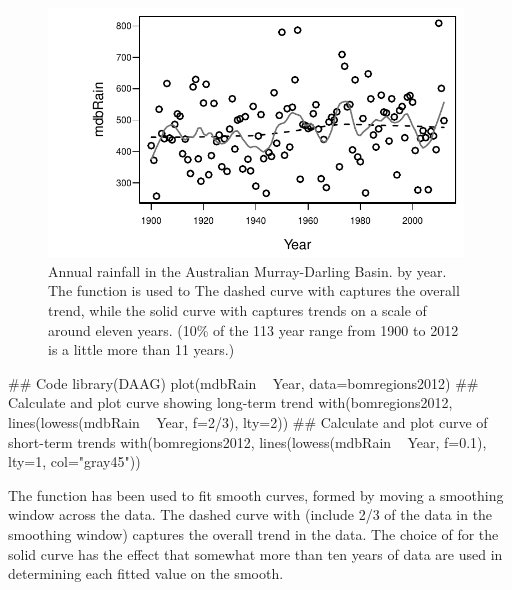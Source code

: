 \begin{figure}
\begin{Schunk}


\centerline{\includegraphics[width=0.98\textwidth]{figs/05-MDBrainfall-1} }

\end{Schunk}
\caption{Annual rainfall in the Australian Murray-Darling Basin.
by year.  The  function is used to
The dashed curve with  captures the
overall trend, while the solid curve with 
captures trends on a scale of around eleven years. (10\% of the 113 year
range from 1900 to 2012 is a little more than 11 years.)\label{fig:mdbRain}}
\vspace*{-6pt}
\end{figure}

\begin{fullwidth}

\begin{Schunk}
\begin{Sinput}
## Code
library(DAAG)
plot(mdbRain ~ Year, data=bomregions2012)
## Calculate and plot curve showing long-term trend
with(bomregions2012, lines(lowess(mdbRain ~ Year, f=2/3), lty=2))
## Calculate and plot curve of short-term trends
with(bomregions2012, lines(lowess(mdbRain ~ Year, f=0.1),
                           lty=1, col="gray45"))
\end{Sinput}
\end{Schunk}

\end{fullwidth}

The  function has been used to fit smooth curves,
formed by moving a smoothing window across the data.
The dashed curve with  (include 2/3 of the data in the
smoothing window) captures the overall trend in the data.
The choice of  for the solid curve has the effect that
somewhat more than ten years of data are used in determining each
fitted value on the smooth.

